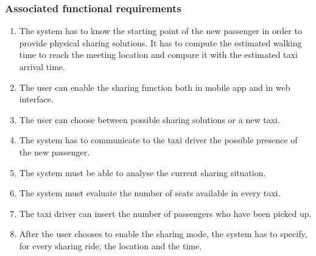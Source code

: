 \subsubsection{Associated functional requirements}
\begin{enumerate}
\item The system has to know the starting point of the new passenger in order to provide physical sharing solutions. It has to compute the estimated walking time to reach the meeting location and compare it with the estimated taxi arrival time.
\item The user can enable the sharing function both in mobile app and in web interface.
\item The user can choose between possible sharing solutions or a new taxi.
\item The system has to communicate to the taxi driver the possible presence of the new passenger.
\item The system must be able to analyse the current sharing situation.
\item The system must evaluate the number of seats available in every taxi.
\item The taxi driver can insert the number of passengers who have been picked up.
\item After the user chooses to enable the sharing mode, the system has to specify, for every sharing ride, the location and the time.
\end{enumerate}
